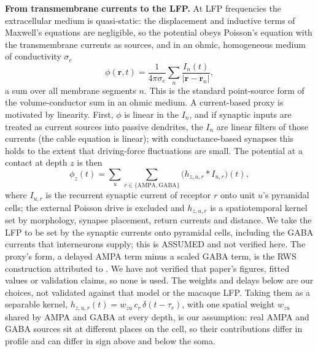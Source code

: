 \textbf{From transmembrane currents to the LFP.} At LFP frequencies the extracellular medium is quasi-static: the
displacement and inductive terms of Maxwell's equations are negligible, so the potential obeys Poisson's equation
with the transmembrane currents as sources, and in an ohmic, homogeneous medium of conductivity $\sigma_e$
\begin{equation*}
\phi(\mathbf{r},t) = \frac{1}{4\pi\sigma_e}\sum_n \frac{I_n(t)}{|\mathbf{r}-\mathbf{r}_n|},
\end{equation*}
a sum over all membrane segments $n$. This is the standard point-source form of the volume-conductor sum in an ohmic medium. A current-based proxy is motivated by linearity. First,
$\phi$ is linear in the $I_n$, and if synaptic inputs are treated as current sources into passive dendrites, the
$I_n$ are linear filters of those currents (the cable equation is linear); with conductance-based synapses this
holds to the extent that driving-force fluctuations are small. The potential at a contact at depth $z$ is then
\begin{equation*}
\phi_z(t) = \sum_u \sum_{r\in\{\text{AMPA},\text{GABA}\}} \bigl(h_{z,u,r} * I_{u,r}\bigr)(t),
\end{equation*}
where $I_{u,r}$ is the recurrent synaptic current of receptor $r$ onto unit $u$'s pyramidal cells; the external Poisson drive is excluded and $h_{z,u,r}$ is
a spatiotemporal kernel set by morphology, synapse placement, return currents and distance. We take the LFP to be set by the synaptic currents onto pyramidal cells, including the GABA currents that interneurons supply; this is ASSUMED and not verified here. The proxy's form, a delayed AMPA term minus a scaled GABA term, is the RWS construction attributed to \citet{Mazzoni2015}. We have not verified that paper's figures, fitted values or validation claims, so none is used. The weights and delays below are our choices, not validated against that model or the macaque LFP. Taking them as a separable kernel, $h_{z,u,r}(t) = w_{zu}\,c_r\,\delta(t-\tau_r)$, with one spatial weight $w_{zu}$ shared by AMPA and GABA at every depth, is our assumption: real AMPA and GABA sources sit at different places on the cell, so their contributions differ in profile and can differ in sign above and below the soma.

